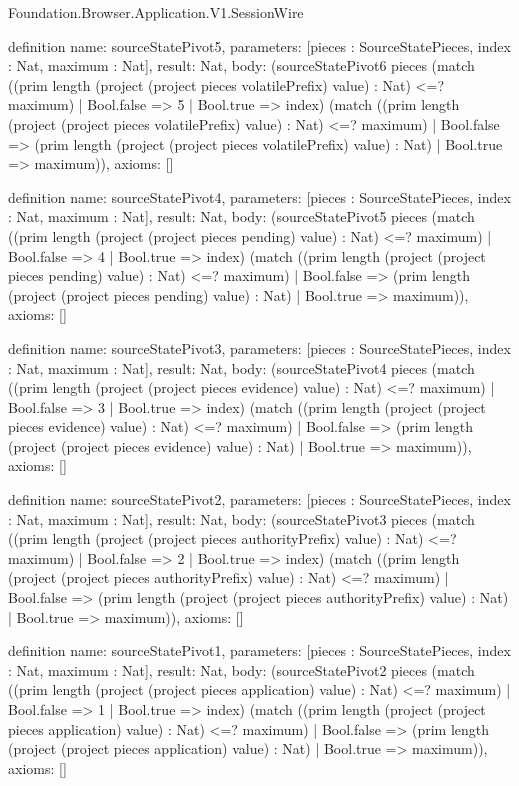 \begin{lexlean}{Foundation.Browser.Application.V1.SessionWire}
\begin{semanticmodule}
definition{
  name: sourceStatePivot5,
  parameters: [pieces : SourceStatePieces, index : Nat, maximum : Nat],
  result: Nat,
  body: (sourceStatePivot6 pieces (match ((prim length (project (project pieces volatilePrefix) value) : Nat) <=? maximum)
    | Bool.false => 5
    | Bool.true => index) (match ((prim length (project (project pieces volatilePrefix) value) : Nat) <=? maximum)
    | Bool.false => (prim length (project (project pieces volatilePrefix) value) : Nat)
    | Bool.true => maximum)),
  axioms: []
}

definition{
  name: sourceStatePivot4,
  parameters: [pieces : SourceStatePieces, index : Nat, maximum : Nat],
  result: Nat,
  body: (sourceStatePivot5 pieces (match ((prim length (project (project pieces pending) value) : Nat) <=? maximum)
    | Bool.false => 4
    | Bool.true => index) (match ((prim length (project (project pieces pending) value) : Nat) <=? maximum)
    | Bool.false => (prim length (project (project pieces pending) value) : Nat)
    | Bool.true => maximum)),
  axioms: []
}

definition{
  name: sourceStatePivot3,
  parameters: [pieces : SourceStatePieces, index : Nat, maximum : Nat],
  result: Nat,
  body: (sourceStatePivot4 pieces (match ((prim length (project (project pieces evidence) value) : Nat) <=? maximum)
    | Bool.false => 3
    | Bool.true => index) (match ((prim length (project (project pieces evidence) value) : Nat) <=? maximum)
    | Bool.false => (prim length (project (project pieces evidence) value) : Nat)
    | Bool.true => maximum)),
  axioms: []
}

definition{
  name: sourceStatePivot2,
  parameters: [pieces : SourceStatePieces, index : Nat, maximum : Nat],
  result: Nat,
  body: (sourceStatePivot3 pieces (match ((prim length (project (project pieces authorityPrefix) value) : Nat) <=? maximum)
    | Bool.false => 2
    | Bool.true => index) (match ((prim length (project (project pieces authorityPrefix) value) : Nat) <=? maximum)
    | Bool.false => (prim length (project (project pieces authorityPrefix) value) : Nat)
    | Bool.true => maximum)),
  axioms: []
}

definition{
  name: sourceStatePivot1,
  parameters: [pieces : SourceStatePieces, index : Nat, maximum : Nat],
  result: Nat,
  body: (sourceStatePivot2 pieces (match ((prim length (project (project pieces application) value) : Nat) <=? maximum)
    | Bool.false => 1
    | Bool.true => index) (match ((prim length (project (project pieces application) value) : Nat) <=? maximum)
    | Bool.false => (prim length (project (project pieces application) value) : Nat)
    | Bool.true => maximum)),
  axioms: []
}


\end{semanticmodule}
\end{lexlean}
